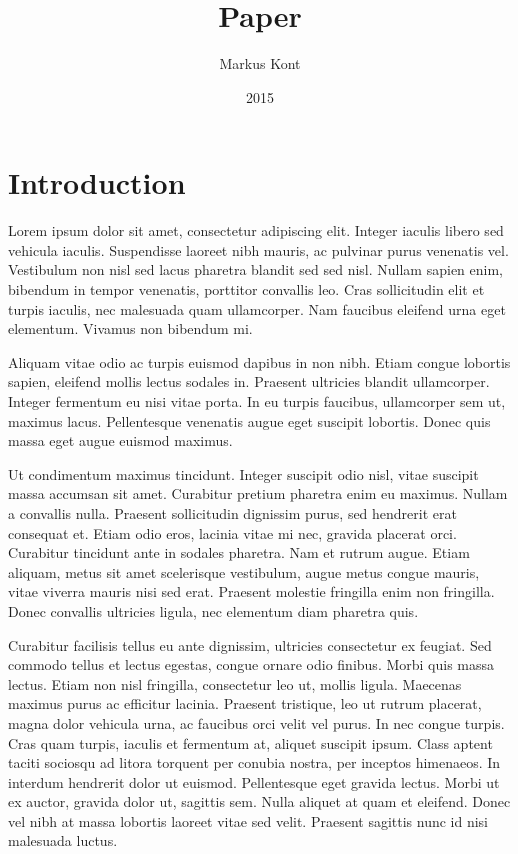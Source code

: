 \documentclass{custom_article}
\title{Paper}
\author{
	Markus Kont
}
\date{2015}
\begin{document}
 
\begin{titlepage}
\maketitle
\end{titlepage}

\tableofcontents
\newpage
 
\section{Introduction}

Lorem ipsum dolor sit amet, consectetur adipiscing elit. Integer iaculis libero sed vehicula iaculis. Suspendisse laoreet nibh mauris, ac pulvinar purus venenatis vel. Vestibulum non nisl sed lacus pharetra blandit sed sed nisl. Nullam sapien enim, bibendum in tempor venenatis, porttitor convallis leo. Cras sollicitudin elit et turpis iaculis, nec malesuada quam ullamcorper. Nam faucibus eleifend urna eget elementum. Vivamus non bibendum mi.

Aliquam vitae odio ac turpis euismod dapibus in non nibh. Etiam congue lobortis sapien, eleifend mollis lectus sodales in. Praesent ultricies blandit ullamcorper. Integer fermentum eu nisi vitae porta. In eu turpis faucibus, ullamcorper sem ut, maximus lacus. Pellentesque venenatis augue eget suscipit lobortis. Donec quis massa eget augue euismod maximus.

Ut condimentum maximus tincidunt. Integer suscipit odio nisl, vitae suscipit massa accumsan sit amet. Curabitur pretium pharetra enim eu maximus. Nullam a convallis nulla. Praesent sollicitudin dignissim purus, sed hendrerit erat consequat et. Etiam odio eros, lacinia vitae mi nec, gravida placerat orci. Curabitur tincidunt ante in sodales pharetra. Nam et rutrum augue. Etiam aliquam, metus sit amet scelerisque vestibulum, augue metus congue mauris, vitae viverra mauris nisi sed erat. Praesent molestie fringilla enim non fringilla. Donec convallis ultricies ligula, nec elementum diam pharetra quis.

Curabitur facilisis tellus eu ante dignissim, ultricies consectetur ex feugiat. Sed commodo tellus et lectus egestas, congue ornare odio finibus. Morbi quis massa lectus. Etiam non nisl fringilla, consectetur leo ut, mollis ligula. Maecenas maximus purus ac efficitur lacinia. Praesent tristique, leo ut rutrum placerat, magna dolor vehicula urna, ac faucibus orci velit vel purus. In nec congue turpis. Cras quam turpis, iaculis et fermentum at, aliquet suscipit ipsum. Class aptent taciti sociosqu ad litora torquent per conubia nostra, per inceptos himenaeos. In interdum hendrerit dolor ut euismod. Pellentesque eget gravida lectus. Morbi ut ex auctor, gravida dolor ut, sagittis sem. Nulla aliquet at quam et eleifend. Donec vel nibh at massa lobortis laoreet vitae sed velit. Praesent sagittis nunc id nisi malesuada luctus.
\end{document}
